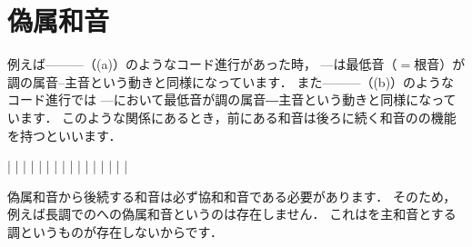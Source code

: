 \documentclass[dvipdfmx,uplatex,b5paper,openany,jbase=12Q,nomag*,textwidth-limit=44%
               ]{gachimuchi}[2020/05/05]
\begin{document}
\section{偽属和音}
例えば\Gni---\Gnii\Min---\Gnv---\Gni （(a)）のようなコード進行があった時，
\Gnii\Min---\Gnv は最低音（$=$根音）が\Gnv 調の属音--主音という動きと同様になっています．
また\Gni---\Gniv---\Gnv---\Gni （(b)）のようなコード進行では
\Gni---\Gniv において最低音が\Gniv 調の属音―主音という動きと同様になっています．
このような関係にあるとき，前にある和音は後ろに続く和音のの機能を持つといいます．%

\begin{floatMusic}[pos=ht]
  \Startpiece%
  \znotes|\en
  \NOTEs
  \zchordsl{\Gni}%
  |%
  \en\bar
  \NOTEs
  \zchordsl{\Gnii\Min}%
  |%
  \en\bar
  \NOTEs
  \zchordsl{\Gnv}%
  |%
  \en\bar
  \NOTEs
  \zchordsl{\Gni}%
  |%
  \en\doublebar
  \znotes|\en
  \NOTEs
  \zchordsl{\Gni}%
  |%
  \en\bar
  \NOTEs
  \zchordsl{\Gniv}%
  |%
  \en\bar
  \NOTEs
  \zchordsl{\Gnv}%
  |%
  \en\bar
  \NOTEs
  \zchordsl{\Gni}%
  |%
  \en\setdoublebar
  \endpiece%
\end{floatMusic}

偽属和音から後続する和音は必ず協和和音である必要があります．
そのため，例えば長調での\Gnvii\Dimt への偽属和音というのは存在しません．
これは\Gnvii\Dimt を主和音とする調というものが存在しないからです．

\begin{comment}
ところで，この例では最低音$=$根音が5度下降・4度上行する例を上げましたが，ここが転回形の和音が絡んできたときにどのように
なるのかが今ひとつ分からないです．
つまり\Gniii m/\Gnv---\Gnvi m/\Gni のような場合（根音，最低音共に5度下行・4度上行だが転回形）はどうなのか，
\Gnii m/\Gniv---\Gnv ，\Gniii m/\Gnv---\Gnvi mのような場合（根音が5度下行・4度上行）はどうなのか，
あるいは\Gniii m/\Gnv---\Gniv /\Gni のような場合（最低音が5度下行・4度上行）はどうなのか，
ちょっとよく分かりません．
\end{comment}
\end{document}
